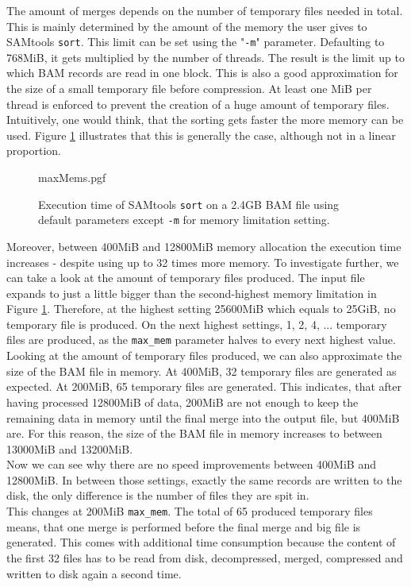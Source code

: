 The amount of merges depends on the number of temporary files needed in total. This is mainly determined by the amount of the memory the user gives to SAMtools \texttt{sort}. This limit can be set using the "\texttt{-m}" parameter. Defaulting to 768MiB, it gets multiplied by the number of threads. The result is the limit up to which BAM records are read in one block. This is also a good approximation for the size of a small temporary file before compression. At least one MiB per thread is enforced to prevent the creation of a huge amount of temporary files. Intuitively, one would think, that the sorting gets faster the more memory can be used. Figure \ref{fig:maxMems} illustrates that this is generally the case, although not in a linear proportion.
\begin{figure}
        {maxMems.pgf}
    \caption{Execution time of SAMtools \texttt{sort} on a 2.4GB BAM file using default parameters except \texttt{-m} for memory limitation setting. }
    \label{fig:maxMems}
\end{figure}
Moreover, between 400MiB and 12800MiB memory allocation the execution time increases - despite using up to 32 times more memory. To investigate further, we can take a look at the amount of temporary files produced. The input file expands to just a little bigger than the second-highest memory limitation in Figure \ref{fig:maxMems}. Therefore, at the highest setting 25600MiB which equals to 25GiB, no temporary file is produced. On the next highest settings, 1, 2, 4, ... temporary files are produced, as the \texttt{max\_mem} parameter halves to every next highest value. Looking at the amount of temporary files produced, we can also approximate the size of the BAM file in memory. At 400MiB, 32 temporary files are generated as expected. At 200MiB, 65 temporary files are generated. This indicates, that after having processed 12800MiB of data, 200MiB are not enough to keep the remaining data in memory until the final merge into the output file, but 400MiB are. For this reason, the size of the BAM file in memory increases to between 13000MiB and 13200MiB. \\
Now we can see why there are no speed improvements between 400MiB and 12800MiB. In between those settings, exactly the same records are written to the disk, the only difference is the number of files they are spit in. \\
This changes at 200MiB \texttt{max\_mem}. The total of 65 produced temporary files means, that one merge is performed before the final merge and big file is generated. This comes with additional time consumption because the content of the first 32 files has to be read from disk, decompressed, merged, compressed  and written to disk again a second time. \\
